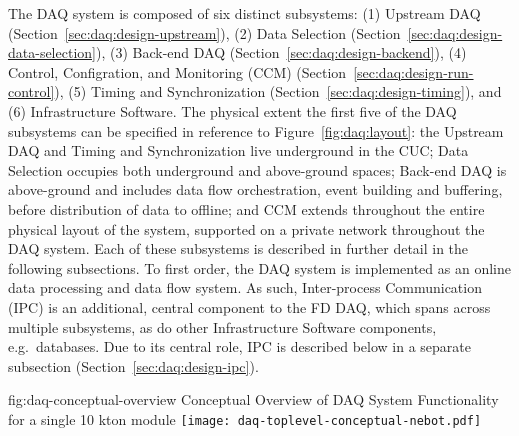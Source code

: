 The DAQ system is composed of six distinct subsystems: (1) Upstream DAQ
(Section~\ref{sec:daq:design-upstream}), (2) Data Selection
(Section~\ref{sec:daq:design-data-selection}), (3) Back-end DAQ
(Section~\ref{sec:daq:design-backend}), (4) Control, Configration, and
Monitoring (CCM) (Section~\ref{sec:daq:design-run-control}), (5) Timing and
Synchronization (Section~\ref{sec:daq:design-timing}), and (6) Infrastructure
Software.
The physical extent the first five of the DAQ subsystems can be specified in
reference to Figure~\ref{fig:daq:layout}: the Upstream DAQ and Timing and
Synchronization live underground in the CUC; Data Selection occupies both
underground and above-ground spaces; Back-end DAQ is above-ground and includes
data flow orchestration, event building and buffering, before distribution of
data to offline; and CCM extends throughout the entire physical layout of the
system, supported on a private network throughout the DAQ system.
Each of these subsystems is described in further detail in the following
subsections.
To first order, the DAQ system is implemented as an online data processing and
data flow system.
As such, Inter-process Communication (IPC) is an additional, central component
to the FD DAQ, which spans across multiple subsystems, as do other
Infrastructure Software components, e.g.~databases.
Due to its central role, IPC is described below in a separate subsection
(Section~\ref{sec:daq:design-ipc}).

\begin{dunefigure}{fig:daq-conceptual-overview}{ Conceptual
   Overview of DAQ System Functionality for a single 10 kton module}
  \texttt{[image: daq-toplevel-conceptual-nebot.pdf]}
\end{dunefigure}


